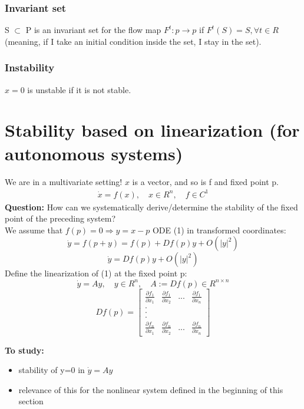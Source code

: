 \subsubsection{Invariant set}
S $\subset$ P is an invariant set for the flow map $F^t: p \to p$ if $F^t(S)=S, \forall t\in R$ (meaning, if I take an initial condition inside the set, I stay in the set).

\subsubsection{Instability}
$x=0$ is unstable if it is not stable.

\section{Stability based on linearization (for autonomous systems)}
We are in a multivariate setting! $x$ is a vector, and so is f and fixed point p.
\begin{align}
    \dot{x}=f(x), \quad x \in R^n, \quad f \in C^1
\end{align}
\textbf{Question:} How can we systematically derive/determine the stability of the fixed point of the preceding system?\\

We assume that $f(p)=0 \Rightarrow y=x-p$
ODE (1) in transformed coordinates: $$\dot{y}=f(p+y)=f(p)+Df(p)y+O(|y|^2)$$
$$\dot{y}=Df(p)y+O(|y|^2)$$
Define the linearization of (1) at the fixed point p:
$$\dot{y}=Ay, \quad y\in R^n, \quad A:=Df(p) \in R^{n\times n}$$
\[
Df(p)=
  \begin{bmatrix}
    \frac{\partial f_1}{\partial x_1} & \frac{\partial f_1}{\partial x_2} & ... & \frac{\partial f_1}{\partial x_n} \\
    .\\
    .\\
    .\\
    \frac{\partial f_n}{\partial x_1} & \frac{\partial f_n}{\partial x_2} &...& \frac{\partial f_n}{\partial x_n}
  \end{bmatrix}
\]

\textbf{To study:}
\begin{itemize}
    \item stability of y=0 in $\dot{y}=Ay$
    \item relevance of this for the nonlinear system defined in the beginning of this section
\end{itemize}

